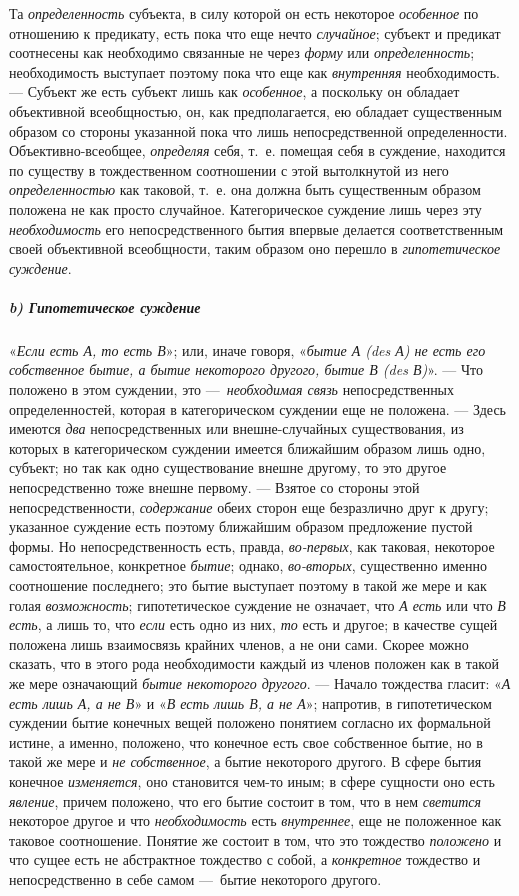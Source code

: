 \documentclass[twoside]{article}
\begin{document}
{{Та {\em определенность}
субъекта, в силу которой он есть некоторое
{\em особенное} по
отношению к предикату, есть пока что еще нечто
{\em случайное}; субъект
и предикат соотнесены как необходимо связанные не через
{\em форму} или
{\em определенность};
необходимость выступает поэтому пока что еще как
{\em внутренняя}
необходимость. — Субъект же есть субъект лишь
как {\em особенное}, а
поскольку он обладает объективной всеобщностью, он, как предполагается, ею
обладает существенным образом со стороны указанной пока что лишь
непосредственной определенности. Объективно-всеобщее,
{\em определяя} себя,
т.~е. помещая себя в суждение, находится по существу в тождественном
соотношении с этой вытолкнутой из него
{\em определенностью} как
таковой, т.~е. она должна быть существенным образом положена не как просто
случайное. Категорическое суждение лишь через эту
{\em необходимость} его
непосредственного бытия впервые делается соответственным своей объективной
всеобщности, таким образом оно перешло в
{\em гипотетическое суждение}.

\subparagraph[b) Гипотетическое суждение]{b) Гипотетическое суждение}
«{\em Если есть А, то есть В}»;
или, иначе говоря,
«{\em бытие А (des А) не есть его
собственное бытие, а бытие некоторого другого, бытие В (des В)}». —
Что положено в этом суждении, это
—~{\em необходимая связь}
непосредственных определенностей, которая в категорическом
суждении еще не положена. — Здесь имеются
{\em два}
непосредственных или внешне-случайных существования, из
которых в категорическом суждении имеется ближайшим образом лишь одно,
субъект; но так как одно существование внешне другому, то это другое
непосредственно тоже внешне первому. — Взятое со стороны
этой непосредственности,
{\em содержание} обеих
сторон еще безразлично друг к другу; указанное суждение есть поэтому
ближайшим образом предложение пустой формы. Но непосредственность есть,
правда, {\em во-первых},
как таковая, некоторое самостоятельное, конкретное
{\em бытие}; однако,
{\em во-вторых},
существенно именно соотношение последнего; это бытие
выступает поэтому в такой же мере и как голая
{\em возможность};
гипотетическое суждение не означает, что
{\em А есть} или что
{\em В есть}, а лишь то,
что {\em если} есть одно
из них, {\em то} есть и
другое; в качестве сущей положена лишь взаимосвязь крайних членов, а не они
сами. Скорее можно сказать, что в этого рода необходимости каждый из членов
положен как в такой же мере означающий
{\em бытие некоторого другого}. —
Начало тождества гласит:
«{\em А есть лишь А, а не В}»
и «{\em В есть лишь В, а
не А}»; напротив, в гипотетическом суждении бытие конечных
вещей положено понятием согласно их формальной истине, а именно, положено,
что конечное есть свое собственное бытие, но в такой же мере и
{\em не собственное}, а
бытие некоторого другого. В сфере бытия конечное
{\em изменяется}, оно
становится чем-то иным; в сфере сущности оно есть
{\em явление}, причем
положено, что его бытие состоит в том, что в нем
{\em светится} некоторое
другое и что {\em необходимость}
есть {\em внутреннее},
еще не положенное как таковое соотношение. Понятие же состоит
в том, что это тождество {\em положено}
и что сущее есть не абстрактное тождество с собой, а
{\em конкретное}
тождество и непосредственно в себе самом
—~бытие некоторого другого.

}}
\end{document}
